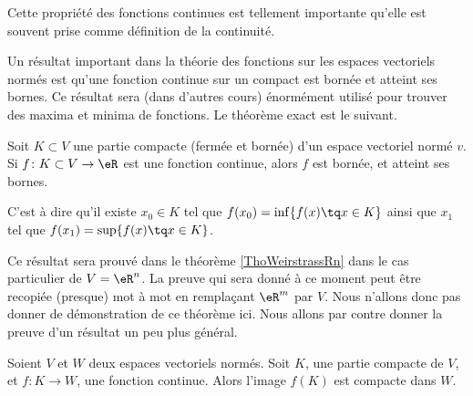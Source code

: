 \begin{remark}
	Cette propriété des fonctions continues est tellement importante qu'elle est souvent prise comme définition de la continuité.
\end{remark}

Un résultat important dans la théorie des fonctions sur les espaces vectoriels normés est qu'une fonction continue sur un compact est bornée et atteint ses bornes. Ce résultat sera (dans d'autres cours) énormément utilisé pour trouver des maxima et minima de fonctions. Le théorème exact est le suivant.

\begin{theorem}		\label{WeierstrassEVN}
	Soit $K\subset V$ une partie compacte (fermée et bornée) d'un espace vectoriel normé $v$. Si $f\colon K\subset V\to \eR$ est une fonction continue, alors $f$ est bornée, et atteint ses bornes. 
	
	C'est à dire qu'il existe $x_0\in K$ tel que $f(x_0)=\inf\{ f(x)\tq x\in K \}$ ainsi que $x_1$ tel que $f(x_1)=\sup\{ f(x)\tq x\in K \}$.
\end{theorem}

Ce résultat sera prouvé dans le théorème \ref{ThoWeirstrassRn} dans le cas particulier de $V=\eR^n$. La preuve qui sera donné à ce moment peut être recopiée (presque) mot à mot en remplaçant $\eR^m$ par $V$. Nous n'allons donc pas donner de démonstration de ce théorème ici. Nous allons par contre donner la preuve d'un résultat un peu plus général.

\begin{proposition}		\label{PropContinueCompactBorne}
	Soient $V$ et $W$ deux espaces vectoriels normés. Soit $K$, une partie compacte de $V$, et $f\colon K\to W$, une fonction continue. Alors l'image $f(K)$ est compacte dans $W$.
\end{proposition}

